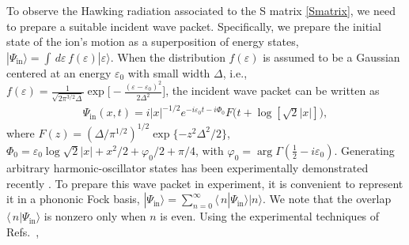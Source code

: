 \documentclass[prl,twocolumn,superscriptaddress,floatfix,showpacs,amsmath,longbibliography,nofootinbib,amssymb]{revtex4-1}
\newcommand{\colp}[1]{\textcolor{purple}{#1}}
\begin{document}
To observe the Hawking radiation associated to the S matrix \eqref{Smatrix}, 
we need to prepare a suitable incident wave packet. 
Specifically, we prepare the initial state of the ion's motion as a superposition of energy states, 
$|\Psi_\text{in}\rangle=\int\,d\varepsilon\,f(\varepsilon)|\varepsilon\rangle$.
When the distribution $f(\varepsilon)$ is assumed to be a Gaussian centered at an energy $\varepsilon_0$ with small width $\Delta$, i.e., 
$f(\varepsilon)=\frac{1}{\sqrt{2\pi^{3/2}\Delta}}\exp\big[-\frac{(\varepsilon-\varepsilon_0)^2}{2\Delta^2}\big]$, the incident wave packet can be written as \cite{BARTON1986322}
\begin{eqnarray}\label{incident-wave}
\Psi_\text{in}(x,t)=i{|x|^{-1/2}}e^{-i\varepsilon_0t-i\Phi_0}
F\big(t+\log[\sqrt{2}|x|]\big),
\end{eqnarray}
where $F(z)=(\Delta/\pi^{1/2})^{1/2}\exp\{-z^2\Delta^2/2\}$, $\Phi_0=\varepsilon_0\log\sqrt{2}|x|+x^2/2+\varphi_0/2+\pi/4$, 
with $\varphi_0=\arg\Gamma(\frac{1}{2}-i\varepsilon_0)$. 
Generating arbitrary harmonic-oscillator states has been experimentally demonstrated recently \cite{PhysRevLett.90.037902}. 
To prepare this wave packet in experiment, it is convenient 
to represent it in a phononic Fock basis, 
$|\Psi_\text{in}\rangle=\sum^\infty_{n=0}\langle\,n|\Psi_\text{in}\rangle|n\rangle$. 
We note that the overlap $\langle\,n|\Psi_\text{in}\rangle$
is nonzero only when $n$ is even. Using the experimental techniques of Refs.~\cite{PhysRevLett.90.037902, PhysRevLett.92.113004},  
\end{document}
